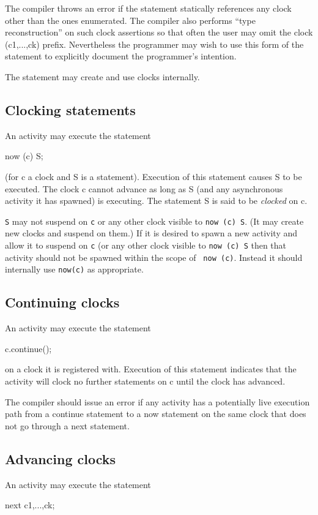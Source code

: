 The \Xten{} compiler throws an error if the statement statically
references any clock other than the ones enumerated. The \Xten{}
compiler also performs ``type reconstruction'' on such clock
assertions so that often the user may omit the {\cf clock (c1,...,ck)}
prefix. Nevertheless the programmer may wish to use this form of the
statement to explicitly document the programmer's intention.

The statement may create and use clocks internally.

\subsection{Clocking statements}
An activity may execute the statement
\begin{x10}
  now (c) S;
\end{x10}
\noindent (for {\cf c} a clock and {\cf S} is a statement). Execution
of this statement causes {\cf S} to be executed. The clock {\cf c}
cannot advance as long as {\cf S} (and any asynchronous activity it
has spawned) is executing. The statement {\cf S} is said to be {\em
clocked} on {\cf c}. 

{\tt S} may not suspend on {\tt c} or any other clock
visible to {\tt now (c) S}. (It may create new clocks and
suspend on them.) If it is desired to spawn a new activity and allow
it to suspend on {\tt c} (or any other clock visible to {\tt now (c)
S} then that activity should not be spawned within the scope of {\tt
now (c)}. Instead it should internally use {\tt now(c)} as appropriate.

\subsection{Continuing clocks}
An activity may execute the statement
\begin{x10}
  c.continue();
\end{x10}
\noindent on a clock it is registered with. Execution of this
statement indicates that the activity will clock no further statements
on {\cf c} until the clock has advanced.

The compiler should issue an error if any activity has a potentially
live execution path from a {\cf continue} statement to a {\cf now}
statement on the same clock that does not go through a {\cf next}
statement.

\subsection{Advancing clocks}
An activity may execute the statement
\begin{x10}
  next c1,...,ck;
\end{x10}

